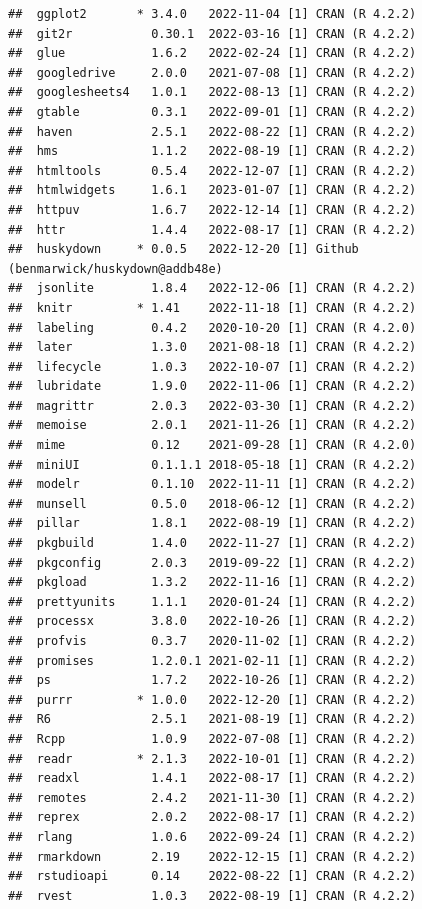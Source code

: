 \documentclass[print]{nuthesis}
\begin{document}
\begin{verbatim}
##  ggplot2       * 3.4.0   2022-11-04 [1] CRAN (R 4.2.2)
##  git2r           0.30.1  2022-03-16 [1] CRAN (R 4.2.2)
##  glue            1.6.2   2022-02-24 [1] CRAN (R 4.2.2)
##  googledrive     2.0.0   2021-07-08 [1] CRAN (R 4.2.2)
##  googlesheets4   1.0.1   2022-08-13 [1] CRAN (R 4.2.2)
##  gtable          0.3.1   2022-09-01 [1] CRAN (R 4.2.2)
##  haven           2.5.1   2022-08-22 [1] CRAN (R 4.2.2)
##  hms             1.1.2   2022-08-19 [1] CRAN (R 4.2.2)
##  htmltools       0.5.4   2022-12-07 [1] CRAN (R 4.2.2)
##  htmlwidgets     1.6.1   2023-01-07 [1] CRAN (R 4.2.2)
##  httpuv          1.6.7   2022-12-14 [1] CRAN (R 4.2.2)
##  httr            1.4.4   2022-08-17 [1] CRAN (R 4.2.2)
##  huskydown     * 0.0.5   2022-12-20 [1] Github (benmarwick/huskydown@addb48e)
##  jsonlite        1.8.4   2022-12-06 [1] CRAN (R 4.2.2)
##  knitr         * 1.41    2022-11-18 [1] CRAN (R 4.2.2)
##  labeling        0.4.2   2020-10-20 [1] CRAN (R 4.2.0)
##  later           1.3.0   2021-08-18 [1] CRAN (R 4.2.2)
##  lifecycle       1.0.3   2022-10-07 [1] CRAN (R 4.2.2)
##  lubridate       1.9.0   2022-11-06 [1] CRAN (R 4.2.2)
##  magrittr        2.0.3   2022-03-30 [1] CRAN (R 4.2.2)
##  memoise         2.0.1   2021-11-26 [1] CRAN (R 4.2.2)
##  mime            0.12    2021-09-28 [1] CRAN (R 4.2.0)
##  miniUI          0.1.1.1 2018-05-18 [1] CRAN (R 4.2.2)
##  modelr          0.1.10  2022-11-11 [1] CRAN (R 4.2.2)
##  munsell         0.5.0   2018-06-12 [1] CRAN (R 4.2.2)
##  pillar          1.8.1   2022-08-19 [1] CRAN (R 4.2.2)
##  pkgbuild        1.4.0   2022-11-27 [1] CRAN (R 4.2.2)
##  pkgconfig       2.0.3   2019-09-22 [1] CRAN (R 4.2.2)
##  pkgload         1.3.2   2022-11-16 [1] CRAN (R 4.2.2)
##  prettyunits     1.1.1   2020-01-24 [1] CRAN (R 4.2.2)
##  processx        3.8.0   2022-10-26 [1] CRAN (R 4.2.2)
##  profvis         0.3.7   2020-11-02 [1] CRAN (R 4.2.2)
##  promises        1.2.0.1 2021-02-11 [1] CRAN (R 4.2.2)
##  ps              1.7.2   2022-10-26 [1] CRAN (R 4.2.2)
##  purrr         * 1.0.0   2022-12-20 [1] CRAN (R 4.2.2)
##  R6              2.5.1   2021-08-19 [1] CRAN (R 4.2.2)
##  Rcpp            1.0.9   2022-07-08 [1] CRAN (R 4.2.2)
##  readr         * 2.1.3   2022-10-01 [1] CRAN (R 4.2.2)
##  readxl          1.4.1   2022-08-17 [1] CRAN (R 4.2.2)
##  remotes         2.4.2   2021-11-30 [1] CRAN (R 4.2.2)
##  reprex          2.0.2   2022-08-17 [1] CRAN (R 4.2.2)
##  rlang           1.0.6   2022-09-24 [1] CRAN (R 4.2.2)
##  rmarkdown       2.19    2022-12-15 [1] CRAN (R 4.2.2)
##  rstudioapi      0.14    2022-08-22 [1] CRAN (R 4.2.2)
##  rvest           1.0.3   2022-08-19 [1] CRAN (R 4.2.2)

\end{verbatim}
\end{document}
